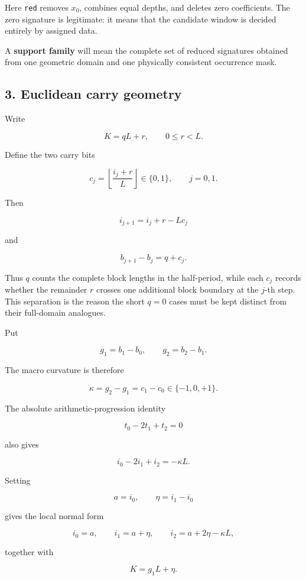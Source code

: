 \documentclass[
  british,
  a4paper,
  11pt]{article}
\begin{document}
Here \texttt{red} removes \(x_0\), combines equal depths, and deletes
zero coefficients. The zero signature is legitimate: it means that the
candidate window is decided entirely by assigned data.

A \textbf{support family} will mean the complete set of reduced
signatures obtained from one geometric domain and one physically
consistent occurrence mask.

\subsection{3. Euclidean carry geometry}\label{euclidean-carry-geometry}

Write

\[
K=qL+r,
\qquad
0\le r<L.
\tag{3.1}
\]

Define the two carry bits

\[
c_j
=
\left\lfloor
\frac{i_j+r}{L}
\right\rfloor
\in\{0,1\},
\qquad j=0,1.
\tag{3.2}
\]

Then

\[
i_{j+1}=i_j+r-Lc_j
\tag{3.3}
\]

and

\[
b_{j+1}-b_j=q+c_j.
\tag{3.4}
\]

Thus \(q\) counts the complete block lengths in the half-period, while
each \(c_j\) records whether the remainder \(r\) crosses one additional
block boundary at the \(j\)-th step. This separation is the reason the
short \(q=0\) cases must be kept distinct from their full-domain
analogues.

Put

\[
g_1=b_1-b_0,
\qquad
g_2=b_2-b_1.
\]

The macro curvature is therefore

\[
\kappa=g_2-g_1=c_1-c_0\in\{-1,0,+1\}.
\tag{3.5}
\]

The absolute arithmetic-progression identity

\[
t_0-2t_1+t_2=0
\]

also gives

\[
i_0-2i_1+i_2=-\kappa L.
\tag{3.6}
\]

Setting

\[
a=i_0,
\qquad
\eta=i_1-i_0
\]

gives the local normal form

\[
i_0=a,
\qquad
i_1=a+\eta,
\qquad
i_2=a+2\eta-\kappa L,
\tag{3.7}
\]

together with

\[
K=g_1L+\eta.
\tag{3.8}
\]
\end{document}

